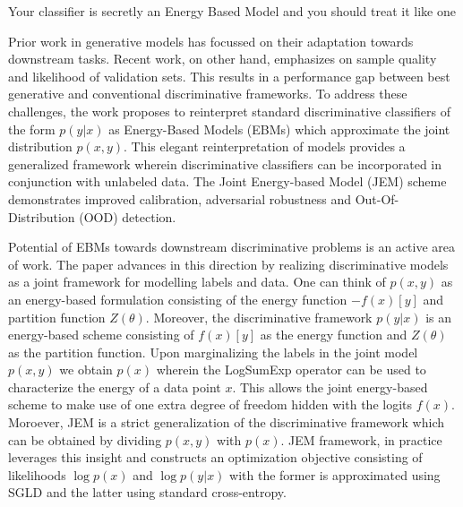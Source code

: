 \documentclass[11pt,letterpaper]{article}
\begin{document}
\begin{center}
  \large{Your classifier is secretly an Energy Based Model and you should treat it like one}
\end{center}

Prior work in generative models has focussed on their adaptation towards downstream tasks. Recent work, on other hand, emphasizes on sample quality and likelihood of validation sets. This results in a performance gap between best generative and conventional discriminative frameworks. To address these challenges, the work proposes to reinterpret standard discriminative classifiers of the form $p(y|x)$ as Energy-Based Models (EBMs) which approximate the joint distribution $p(x,y)$. This elegant reinterpretation of models provides a generalized framework wherein discriminative classifiers can be incorporated in conjunction with unlabeled data. The Joint Energy-based Model (JEM) scheme demonstrates improved calibration, adversarial robustness and Out-Of-Distribution (OOD) detection. 

Potential of EBMs towards downstream discriminative problems is an active area of work. The paper advances in this direction by realizing discriminative models as a joint framework for modelling labels and data. One can think of $p(x,y)$ as an energy-based formulation consisting of the energy function $-f(x)[y]$ and partition function $Z(\theta)$. Moreover, the discriminative framework $p(y|x)$ is an energy-based scheme consisting of $f(x)[y]$ as the energy function and $Z(\theta)$ as the partition function. Upon marginalizing the labels in the joint model $p(x,y)$ we obtain $p(x)$ wherein the LogSumExp operator can be used to characterize the energy of a data point $x$. This allows the joint energy-based scheme to make use of one extra degree of freedom hidden with the logits $f(x)$. Moroever, JEM is a strict generalization of the discriminative framework which can be obtained by dividing $p(x,y)$ with $p(x)$. JEM framework, in practice leverages this insight and constructs an optimization objective consisting of likelihoods $\log p(x)$ and $\log p(y|x)$ with the former is approximated using SGLD and the latter using standard cross-entropy. 
\end{document}
